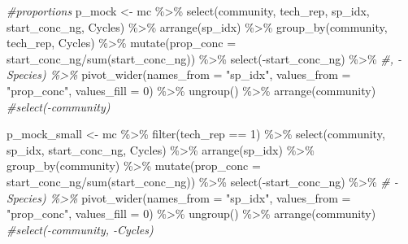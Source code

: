 \documentclass[
]{article}
\newenvironment{Shaded}{\begin{snugshade}}{\end{snugshade}}
\newcommand{\AttributeTok}[1]{\textcolor[rgb]{0.77,0.63,0.00}{#1}}
\newcommand{\CommentTok}[1]{\textcolor[rgb]{0.56,0.35,0.01}{\textit{#1}}}
\newcommand{\DecValTok}[1]{\textcolor[rgb]{0.00,0.00,0.81}{#1}}
\newcommand{\FunctionTok}[1]{\textcolor[rgb]{0.00,0.00,0.00}{#1}}
\newcommand{\NormalTok}[1]{#1}
\newcommand{\OtherTok}[1]{\textcolor[rgb]{0.56,0.35,0.01}{#1}}
\newcommand{\SpecialCharTok}[1]{\textcolor[rgb]{0.00,0.00,0.00}{#1}}
\newcommand{\StringTok}[1]{\textcolor[rgb]{0.31,0.60,0.02}{#1}}
\begin{document}
\begin{Shaded}
\begin{Highlighting}[]
\CommentTok{\#proportions}
\NormalTok{p\_mock }\OtherTok{\textless{}{-}}\NormalTok{ mc }\SpecialCharTok{\%\textgreater{}\%} 
  \FunctionTok{select}\NormalTok{(community, tech\_rep, sp\_idx, start\_conc\_ng, Cycles) }\SpecialCharTok{\%\textgreater{}\%} 
  \FunctionTok{arrange}\NormalTok{(sp\_idx) }\SpecialCharTok{\%\textgreater{}\%} 
  \FunctionTok{group\_by}\NormalTok{(community, tech\_rep, Cycles) }\SpecialCharTok{\%\textgreater{}\%} 
  \FunctionTok{mutate}\NormalTok{(}\AttributeTok{prop\_conc =}\NormalTok{ start\_conc\_ng}\SpecialCharTok{/}\FunctionTok{sum}\NormalTok{(start\_conc\_ng)) }\SpecialCharTok{\%\textgreater{}\%} 
  \FunctionTok{select}\NormalTok{(}\SpecialCharTok{{-}}\NormalTok{start\_conc\_ng) }\SpecialCharTok{\%\textgreater{}\%} \CommentTok{\#, {-}Species) \%\textgreater{}\% }
  \FunctionTok{pivot\_wider}\NormalTok{(}\AttributeTok{names\_from =} \StringTok{"sp\_idx"}\NormalTok{, }\AttributeTok{values\_from =} \StringTok{"prop\_conc"}\NormalTok{, }\AttributeTok{values\_fill =} \DecValTok{0}\NormalTok{) }\SpecialCharTok{\%\textgreater{}\%} 
  \FunctionTok{ungroup}\NormalTok{() }\SpecialCharTok{\%\textgreater{}\%} 
  \FunctionTok{arrange}\NormalTok{(community)}
  \CommentTok{\#select({-}community)}

\NormalTok{p\_mock\_small }\OtherTok{\textless{}{-}}\NormalTok{ mc }\SpecialCharTok{\%\textgreater{}\%} 
  \FunctionTok{filter}\NormalTok{(tech\_rep }\SpecialCharTok{==} \DecValTok{1}\NormalTok{) }\SpecialCharTok{\%\textgreater{}\%} 
  \FunctionTok{select}\NormalTok{(community, sp\_idx, start\_conc\_ng, Cycles) }\SpecialCharTok{\%\textgreater{}\%} 
  \FunctionTok{arrange}\NormalTok{(sp\_idx) }\SpecialCharTok{\%\textgreater{}\%} 
  \FunctionTok{group\_by}\NormalTok{(community) }\SpecialCharTok{\%\textgreater{}\%} 
  \FunctionTok{mutate}\NormalTok{(}\AttributeTok{prop\_conc =}\NormalTok{ start\_conc\_ng}\SpecialCharTok{/}\FunctionTok{sum}\NormalTok{(start\_conc\_ng)) }\SpecialCharTok{\%\textgreater{}\%} 
  \FunctionTok{select}\NormalTok{(}\SpecialCharTok{{-}}\NormalTok{start\_conc\_ng) }\SpecialCharTok{\%\textgreater{}\%}  \CommentTok{\# {-}Species) \%\textgreater{}\% }
  \FunctionTok{pivot\_wider}\NormalTok{(}\AttributeTok{names\_from =} \StringTok{"sp\_idx"}\NormalTok{, }\AttributeTok{values\_from =} \StringTok{"prop\_conc"}\NormalTok{, }\AttributeTok{values\_fill =} \DecValTok{0}\NormalTok{) }\SpecialCharTok{\%\textgreater{}\%} 
  \FunctionTok{ungroup}\NormalTok{() }\SpecialCharTok{\%\textgreater{}\%} 
  \FunctionTok{arrange}\NormalTok{(community)}
  \CommentTok{\#select({-}community, {-}Cycles)}


\end{Highlighting}
\end{Shaded}
\end{document}
